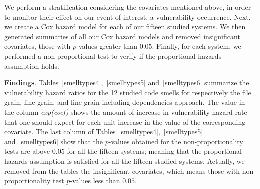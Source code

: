 {We perform a stratification considering the covariates mentioned above, in order to monitor their effect on our event of interest, \ie{} a vulnerability occurrence. Next, we create a Cox hazard model for each of our fifteen studied systems.
We then generated summaries of all our Cox hazard models and removed insignificant covariates, \ie{} those with $p$-values greater than $0.05$. Finally, for each system, we performed a non-proportional test to verify if the proportional hazards assumption holds. 

\textbf{Findings}. Tables~\ref{smelltypes4},~\ref{smelltypes5} and~\ref{smelltypes6} summarize the vulnerability hazard ratios for the 12 studied code smells for respectively the file grain, line grain, and line grain including dependencies approach. The value in the column \textsl{exp(coef)} shows the amount of increase in vulnerability hazard rate that one should expect for each unit increase in the value of the corresponding covariate.
The last column of Tables~\ref{smelltypes4},~\ref{smelltypes5} and~\ref{smelltypes6} show that the $p$-values obtained for the non-proportionality tests are above $0.05$ for all the fifteen systems; meaning that the proportional hazards assumption is satisfied for all the fifteen studied systems. Actually, we removed from the tables the insignificant covariates, which means those with non-proportionality test $p$-values less than $0.05$.

}
